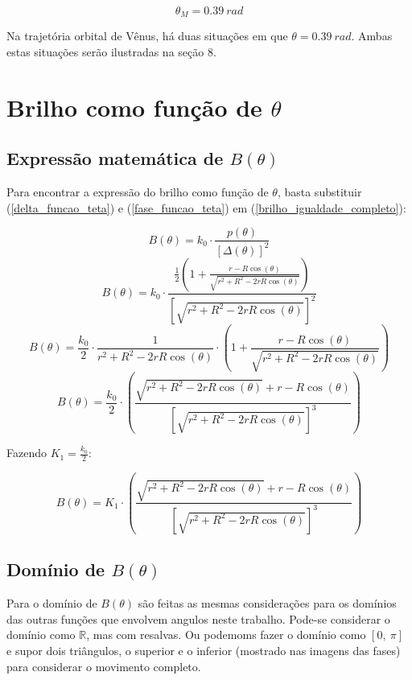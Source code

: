 \documentclass[a4paper, 12pt]{article}
\begin{document}
$$\boxed{\ \theta_M =0.39\ rad\ }$$

Na trajetória orbital de Vênus, há duas situações em que $\theta =0.39\ rad$. Ambas estas situações serão ilustradas na seção 8.

\section{Brilho como função de $\theta$}

\subsection{Expressão matemática de $B\left(\theta \right)$}

Para encontrar a expressão do brilho como função de $\theta$, basta substituir (\ref{delta_funcao_teta}) e (\ref{fase_funcao_teta}) em (\ref{brilho_igualdade_completo}):

$$B\left(\theta \right)=k_0\cdot \frac{p\left(\theta \right)}{\left[\Delta \left(\theta \right)\right]^2}$$
$$B\left(\theta \right)=k_0\cdot \frac{\frac{1}{2}\left(1+\frac{r-R\cos \left(\theta \right)}{\sqrt{r^2+R^2-2rR\cos \left(\theta \right)}}\right)}{\left[\sqrt{r^2+R^2-2rR\cos \left(\theta \right)}\right]^2}$$
$$B\left(\theta \right)=\frac{k_0}{2}\cdot \frac{1}{r^2+R^2-2rR\cos \left(\theta \right)}\cdot \left(1+\frac{r-R\cos \left(\theta \right)}{\sqrt{r^2+R^2-2rR\cos \left(\theta \right)}}\right)$$
$$B\left(\theta \right)=\frac{k_0}{2}\cdot \left(\frac{\sqrt{r^2+R^2-2rR\cos \left(\theta \right)}+r-R\cos \left(\theta \right)}{\left[\sqrt{r^2+R^2-2rR\cos \left(\theta \right)}\right]^3}\right)$$

Fazendo $K_1=\frac{k_0}{2}$:


\begin{equation}\label{brilho_funcao_teta}
    \boxed{\ B\left(\theta \right)=K_1\cdot \left(\frac{\sqrt{r^2+R^2-2rR\cos \left(\theta \right)}+r-R\cos \left(\theta \right)}{\left[\sqrt{r^2+R^2-2rR\cos \left(\theta \right)}\right]^3}\right)\ }
\end{equation}


\subsection{Domínio de $B\left(\theta \right)$}
Para o domínio de $B\left(\theta \right)$ são feitas as mesmas considerações para os domínios das outras funções que envolvem angulos neste trabalho. Pode-se considerar o domínio como $\mathbb{R}$, mas com resalvas. Ou podemoms fazer o domínio como $[0,\ \pi]$ e supor dois triângulos, o superior e o inferior (mostrado nas imagens das fases) para considerar o movimento completo.
 
\end{document}
